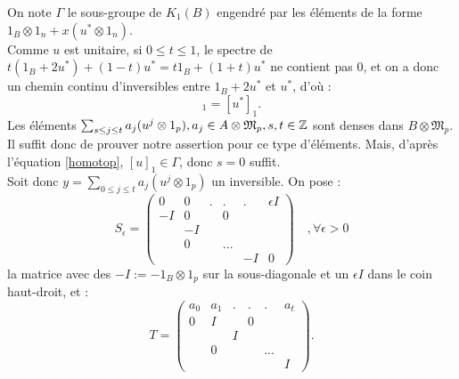 \begin{dem}
On note $\Gamma$ le sous-groupe de $K_1(B)$ engendré par les éléments de la forme $1_B\otimes 1_n+x(u^*\otimes 1_n)$.\\

Comme $u$ est unitaire, si $0\leq t\leq 1$, le spectre de $t(1_B+2u^*) + (1-t)u^*=t1_B + (1+t)u^*$ ne contient pas $0$, et on a donc un chemin continu d'inversibles entre $1_B+2u^*$ et $u^*$, d'où :
\begin{equation}[1_B+2u^*]_1=[u^*]_1.\label{homotop}\end{equation}
Les éléments $\sum_{s\leq j\leq t}a_j(u^j\otimes 1_p), a_j \in A\otimes \mathfrak M_p,s,t\in \mathbb Z$ sont denses dans $B\otimes \mathfrak M_p$. Il suffit donc de prouver notre assertion pour ce type d'éléments. Mais, d'après l'équation \ref{homotop}, $[u]_1\in \Gamma$, donc $s=0$ suffit.\\

Soit donc $y=\sum_{0\leq j\leq t}a_j(u^j\otimes 1_p)$ un inversible. On pose :
\[S_\epsilon = \begin{pmatrix}0 & 0 &  .&. &. &      \epsilon I \\
				-I & 0 &  & 0 & &		    \\
				 &    -I   &   &  &  &               \\
				&      0 &    &  ... &  &        \\
				&      &     &    &-I & 0
\end{pmatrix} \quad ,\forall \epsilon >0 \]
la matrice avec des $-I:=-1_B\otimes 1_p$ sur la sous-diagonale et un $\epsilon I$ dans le coin haut-droit, et :
\[T = \begin{pmatrix}         a_0 &  a_1 &  .   &.   &.     &      a_t \\
				0 &      I &       & 0 &      &		    \\
				   &        & I     &    &      &               \\
				   &    0  &       &    & ... &        \\
				   &        &       &    &      & I
\end{pmatrix}.  \]


\end{dem}

